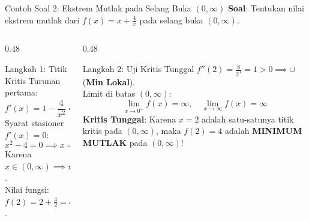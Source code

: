 \documentclass[aspectratio=43,10pt]{beamer}
\begin{document}
\begin{frame}{Contoh Soal 2: Ekstrem Mutlak pada Selang Buka $(0, \infty)$}
    \textbf{Soal}: Tentukan nilai ekstrem mutlak dari $f(x) = x + \frac{4}{x}$ pada selang buka $(0, \infty)$.

    \pause
    \vspace{0.08cm}
    \begin{columns}[T]
        \begin{column}{0.48\textwidth}
            \begin{block}{Langkah 1: Titik Kritis}
                Turunan pertama:
                \[
                    f'(x) = 1 - \frac{4}{x^2} = \frac{x^2 - 4}{x^2}
                \]
                Syarat stasioner $f'(x) = 0$:
                \[
                    x^2 - 4 = 0 \implies x = \pm 2
                \]
                Karena $x \in (0, \infty) \implies \mathbf{x = 2}$.\\
                Nilai fungsi: $f(2) = 2 + \frac{4}{2} = \mathbf{4}$.
            \end{block}
        \end{column}

        \begin{column}{0.48\textwidth}
            \begin{exampleblock}{Langkah 2: Uji Kritis Tunggal}
                $f''(2) = \frac{8}{2^3} = 1 > 0 \implies \cup$ (\textbf{Min Lokal}).\\
                \vspace{0.05cm}
                Limit di batas $(0, \infty)$:
                \[
                    \lim_{x \to 0^+} f(x) = \infty, \quad \lim_{x \to \infty} f(x) = \infty
                \]
                \textbf{Kritis Tunggal}: Karena $x=2$ adalah satu-satunya titik kritis pada $(0, \infty)$, maka $f(2) = 4$ adalah \textbf{MINIMUM MUTLAK} pada $(0, \infty)$!
            \end{exampleblock}
        \end{column}
    \end{columns}
\end{frame}
\end{document}
